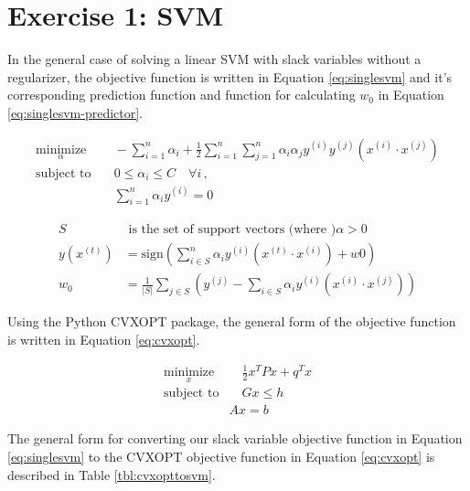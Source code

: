 \documentclass[10pt]{article}
\begin{document}
\section{Exercise 1: SVM}

In the general case of solving a linear SVM with slack variables without a regularizer, the objective function is written in Equation \ref{eq:singlesvm} and it's corresponding prediction function and function for calculating $w_0$ in Equation \ref{eq:singlesvm-predictor}.

\begin{subequations}
\begin{align}
	\underset{\alpha}{\text{minimize}}
		& \quad -\sum_{i = 1}^n \alpha_i + \frac{1}{2} \sum_{i = 1}^n \sum_{j = 1}^n \alpha_i \alpha_j y^{(i)} y^{(j)} (x^{(i)} \cdot x^{(j)}) \\
	\text{subject to}
		& \quad 0 \leq \alpha_i \leq C \quad \forall i \,, \\
		& \quad \sum_{i = 1}^n \alpha_i y^{(i)} = 0
\end{align}
\label{eq:singlesvm}
\end{subequations}

\begin{subequations}
\begin{align}
	S & \text{ is the set of support vectors (where )} \alpha > 0 \\
	y(x^{(t)}) &= \text{sign}\left(\sum_{i \in S}^n \alpha_i y^{(i)} (x^{(t)} \cdot x^{(i)}) + w0 \right)\\
	w_0 &= \frac{1}{|S|} \sum_{j \in S} \left(y^{(j)} - \sum_{i \in S} \alpha_i y^{(i)} (x^{(i)} \cdot x^{(j)}) \right)
\end{align}
\label{eq:singlesvm-predictor}
\end{subequations}

Using the Python CVXOPT package, the general form of the objective function is written in Equation \ref{eq:cvxopt}.

\begin{subequations}
\begin{align}
	\underset{x}{\text{minimize}}
		& \quad \frac{1}{2}x^T P x + q^T x \\
	\text{subject to} 
		& \quad Gx \leq h \\
		& Ax = b
\end{align}
\label{eq:cvxopt}
\end{subequations}

The general form for converting our slack variable objective function in Equation \ref{eq:singlesvm} to the CVXOPT objective function in Equation \ref{eq:cvxopt} is described in Table \ref{tbl:cvxopttosvm}.
\end{document}
